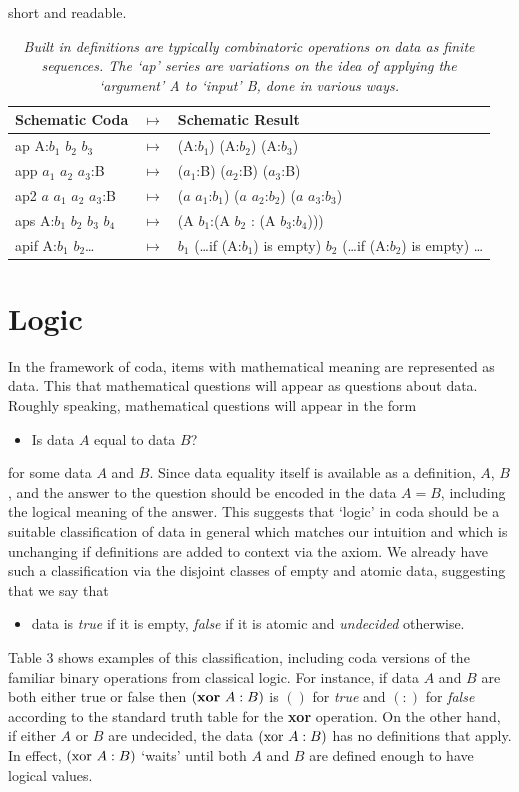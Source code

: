 \documentclass[11pt]{article}
\begin{document}
short and readable.  
\begin{table}
\begin{tabular}{| l  l  l | }
Schematic Coda & $\mapsto$ & Schematic Result \\
\hline
ap A:$b_1$ $b_2$ $b_3$ & $\mapsto$ & (A:$b_1$) (A:$b_2$) (A:$b_3$) \\
app $a_1$ $a_2$ $a_3$:B &  $\mapsto$ & ($a_1$:B) ($a_2$:B) ($a_3$:B) \\
ap2 $a$ $a_1$ $a_2$ $a_3$:B & $\mapsto$ & ($a$ $a_1$:$b_1$) ($a$ $a_2$:$b_2$) ($a$ $a_3$:$b_3$) \\
aps A:$b_1$ $b_2$ $b_3$ $b_4$ & $\mapsto$ & (A $b_1$:(A $b_2$ : (A $b_3$:$b_4$))) \\
apif A:$b_1$ $b_2$\dots & $\mapsto$ & $b_1$ (\dots if (A:$b_1$) is empty) $b_2$ (\dots if (A:$b_2$) is empty) \dots \\
\hline
\end{tabular} 
\caption{\label{ }{\it Built in definitions are typically combinatoric operations on data as finite sequences.  The `ap' series are variations on the 
idea of applying the `argument' A to `input' B, done in various ways.}}   
\end{table}

\section{Logic}

    In the framework of coda, items with mathematical meaning are represented as data.  This that mathematical 
questions will appear as questions about data.  Roughly speaking, mathematical questions will appear 
in the form 
\begin{itemize}
\item[] Is data $A$ equal to data $B$?
\end{itemize}
for some data $A$ and $B$.  
Since data equality itself is available as a definition, $A$, $B$, and the answer to the question should be encoded in the data $A=B$\cite{sugar}, 
including the logical meaning of the answer.  This suggests that `logic' in coda should be a suitable classification of 
data in general which matches our intuition and which is unchanging if definitions are added to context via the axiom.  
We already have such a classification via the disjoint classes of empty and atomic data, suggesting that we say that 
\begin{itemize}
\item data is {\it true} if it is empty, {\it false} if it is atomic and {\it undecided} otherwise. 
\end{itemize}
Table 3 shows examples of this classification, including coda versions of the familiar binary operations from classical logic.   
For instance, if data $A$ and $B$ are both either true or false then $({\bf xor}\ A:B)$ is $()$ for {\it true} and $(:)$ for {\it false} according to the standard truth
 table for the {\bf xor} operation.  On the other hand, if either $A$ or $B$ are 
undecided, the data $({\rm xor}\ A:B)$ has no definitions that apply.  In effect, $({\rm xor}\ A:B)$ `waits' until both $A$ and $B$ are defined enough to have logical values.   
\end{document}
